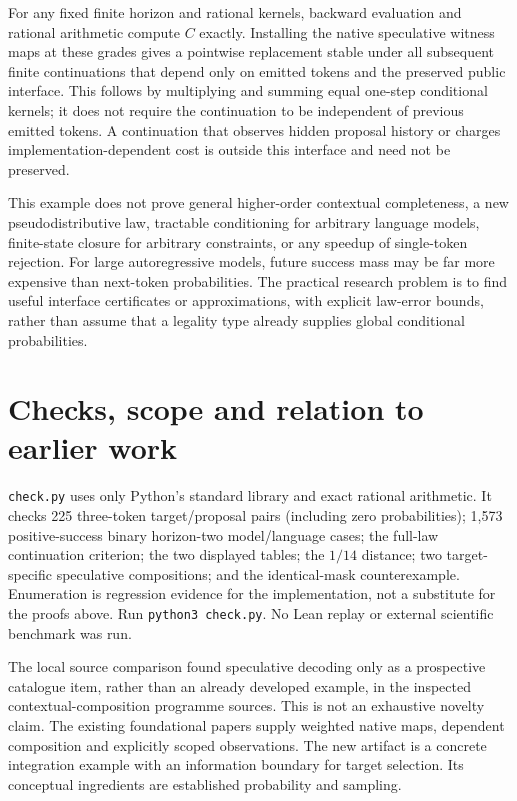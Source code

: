 \documentclass[11pt]{article}
\begin{document}
For any fixed finite horizon and rational kernels, backward evaluation and
rational arithmetic compute $C$ exactly. Installing the native speculative
witness maps at these grades gives a pointwise replacement stable under all
subsequent finite continuations that depend only on emitted tokens and the
preserved public interface. This follows by multiplying and summing equal
one-step conditional kernels; it does not require the continuation to be
independent of previous emitted tokens. A continuation that observes hidden
proposal history or charges implementation-dependent cost is outside this
interface and need not be preserved.

This example does not prove general higher-order contextual completeness,
a new pseudodistributive law, tractable conditioning for arbitrary language
models, finite-state closure for arbitrary constraints, or any speedup of
single-token rejection. For large autoregressive models, future success mass
may be far more expensive than next-token probabilities. The practical
research problem is to find useful interface certificates or approximations,
with explicit law-error bounds, rather than assume that a legality type
already supplies global conditional probabilities.

\section{Checks, scope and relation to earlier work}
\texttt{check.py} uses only Python's standard library and exact rational
arithmetic. It checks 225 three-token target/proposal pairs (including zero
probabilities); 1,573 positive-success binary horizon-two model/language cases;
the full-law continuation criterion; the two displayed tables; the $1/14$
distance; two target-specific speculative compositions; and the identical-mask
counterexample. Enumeration is regression evidence for the implementation,
not a substitute for the proofs above. Run \texttt{python3 check.py}.
No Lean replay or external scientific benchmark was run.

The local source comparison found speculative decoding only as a prospective
catalogue item, rather than an already developed example, in the inspected
contextual-composition programme sources. This is not an exhaustive novelty
claim. The existing foundational papers supply weighted native maps,
dependent composition and explicitly scoped observations. The new artifact is
a concrete integration example with an information boundary for target
selection. Its conceptual ingredients are established probability and sampling.
\end{document}
